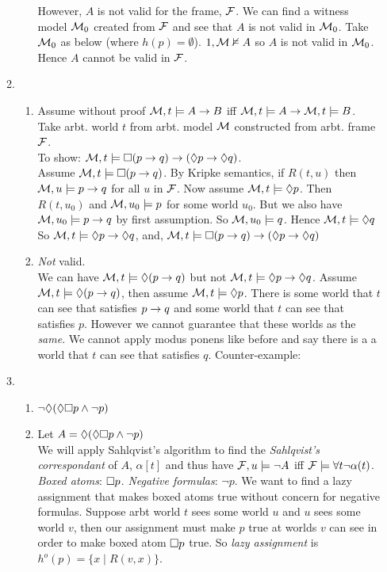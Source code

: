 \documentclass[a4paper, draft, 12pt]{article}
\begin{document}
\begin{enumerate}
\begin{enumerate}
\begin{enumerate}
  However, $A$ is not valid for the frame, $\mathcal{F}$. 
  We can find a witness model $\mathcal{M}_0$ created from $\mathcal{F}$ and see that $A$ is not valid in $\mathcal{M}_0$. 
  Take $\mathcal{M}_0$ as below (where $h(p) = \emptyset$). $1, \mathcal{M} \nvDash A$ so 
  $A$ is not valid in $\mathcal{M}_0$. Hence $A$ cannot be valid in $\mathcal{F}$.
  \end{enumerate}
\item 
  \begin{enumerate}
  \item
  Assume without proof $\mathcal{M}, t \models A \rightarrow B$ iff $\mathcal{M}, t \models A \rightarrow \mathcal{M}, t \models B$. \\
  Take arbt. world $t$ from arbt. model $\mathcal{M}$ constructed from arbt. frame $\mathcal{F}$. \\
  To show: $\mathcal{M}, t \models \square(p \rightarrow q) \rightarrow (\Diamond p \rightarrow \Diamond q)$.\\
  Assume $\mathcal{M}, t \models \square(p \rightarrow q)$.
  By Kripke semantics, if $R(t,u)$ then $\mathcal{M}, u \models p \rightarrow q$ for 
  all $u$ in $\mathcal{F}$. Now assume $\mathcal{M}, t \models \Diamond p$. Then $R(t,u_0)$ and $\mathcal{M}, u_0 \models p$ for some world $u_0$.
  But we also have $\mathcal{M}, u_0 \models p \rightarrow q$ by first assumption. So $\mathcal{M}, u_0 \models q$. 
  Hence $\mathcal{M}, t \models \Diamond q$ So $\mathcal{M}, t \models \Diamond p \rightarrow \Diamond q$, and, $\mathcal{M}, t \models \square(p \rightarrow q) \rightarrow (\Diamond p \rightarrow \Diamond q)$
  \item
  \textit{Not} valid. \\
  We can have $\mathcal{M}, t \models \Diamond(p \rightarrow q)$ but not $\mathcal{M}, t \models \Diamond p \rightarrow \Diamond q$. 
  Assume $\mathcal{M}, t \models \Diamond(p \rightarrow q)$, then assume $\mathcal{M}, t \models \Diamond p$. 
  There is some world that $t$ can see that satisfies $p \rightarrow q$ and some world 
  that $t$ can see that satisfies $p$. 
  However we cannot guarantee that these worlds as the \textit{same}. We cannot 
  apply modus ponens like before and say there is a a world that $t$ can see that satisfies $q$. 
  Counter-example:
  \end{enumerate}
\item 
  \begin{enumerate}
  \item
  $\neg \Diamond(\Diamond \square p \wedge \neg p)$
  \item
  Let $A = \Diamond(\Diamond \square p \wedge \neg p)$ \\
  We will apply Sahlqvist's algorithm to find the \textit{Sahlqvist's correspondant} of $A$, $\alpha[t]$ and 
  thus have $\mathcal{F}, u \models \neg A$ iff $\mathcal{F} \models \forall t \neg \alpha(t)$. 
  \textit{Boxed atoms}: $\square p$.  \textit{Negative formulas}: $\neg p$. We want to find a lazy assignment that 
  makes boxed atoms true without concern for negative formulas. 
  Suppose arbt world $t$ sees some world $u$ and $u$ sees some world $v$, 
  then our assignment must make $p$ true at worlds $v$ can see in order to 
  make boxed atom $\square p$ true. So \textit{lazy assignment} is $h^{o}(p) = \{x \;|\; R(v,x)\}$.


\end{enumerate}
\end{enumerate}
\end{enumerate}
\end{document}
